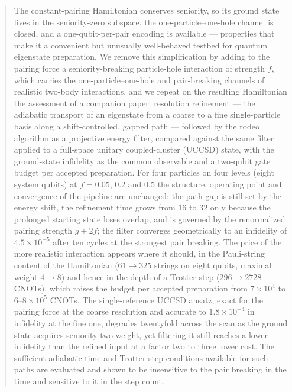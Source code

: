 \documentclass[
  aps,            %
  prc,            %
  reprint,        %
  superscriptaddress,
  floatfix,
  nofootinbib
]{revtex4-2}
\begin{document}
\begin{abstract}
The constant-pairing Hamiltonian conserves seniority, so its ground state
lives in the seniority-zero subspace, the one-particle--one-hole channel is
closed, and a one-qubit-per-pair encoding is available --- properties that
make it a convenient but unusually well-behaved testbed for quantum
eigenstate preparation.  We remove this simplification by adding to the
pairing force a seniority-breaking particle-hole interaction of strength $f$,
which carries the one-particle--one-hole and pair-breaking channels of
realistic two-body interactions, and we repeat on the resulting Hamiltonian
the assessment of a companion paper: resolution refinement --- the adiabatic
transport of an eigenstate from a coarse to a fine single-particle basis
along a shift-controlled, gapped path --- followed by the rodeo algorithm as
a projective energy filter, compared against the same filter applied to a
full-space unitary coupled-cluster (UCCSD) state, with the ground-state
infidelity as the common observable and a two-qubit gate budget per accepted
preparation.  For four particles on four levels (eight system qubits) at
$f=0.05$, $0.2$ and $0.5$ the structure, operating point and convergence of
the pipeline are unchanged: the path gap is still set by the energy shift,
the refinement time grows from $16$ to $32$ only because the prolonged
starting state loses overlap, and is governed by the renormalized pairing
strength $g+2f$; the filter converges geometrically to an infidelity of
$4.5\times10^{-5}$ after ten cycles at the strongest pair breaking.  The
price of the more realistic interaction appears where it should, in the
Pauli-string content of the Hamiltonian ($61\to325$ strings on eight
qubits, maximal weight $4\to8$) and hence in the depth of a Trotter step
($296\to2728$ CNOTs), which raises the budget per accepted preparation from
$7\times10^{4}$ to $6$--$8\times10^{5}$ CNOTs.  The single-reference UCCSD
ansatz, exact for the pairing force at the coarse resolution and accurate to
$1.8\times10^{-4}$ in infidelity at the fine one, degrades twentyfold across
the scan as the ground state acquires seniority-two weight, yet filtering it
still reaches a lower infidelity than the refined input at a factor two to
three lower cost.  The sufficient adiabatic-time and Trotter-step conditions
available for such paths are evaluated and shown to be insensitive to the
pair breaking in the time and sensitive to it in the step count.
\end{abstract}

\maketitle
\end{document}
